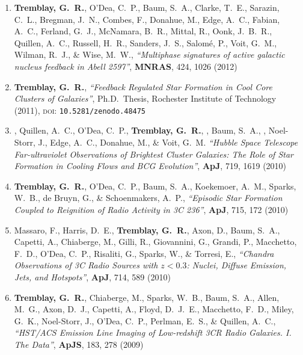 \documentclass[11pt]{article}
\begin{document}
\begin{enumerate}
\item \textbf{Tremblay, G.~R.}, O'Dea, C.~P., Baum, S.~A., Clarke, T.~E., Sarazin,
C.~L., Bregman, J.~N., Combes, F., Donahue, M., Edge, A.~C., Fabian, A.~C.,
Ferland, G.~J., McNamara, B.~R., Mittal, R., Oonk, J.~B.~R., Quillen,
A.~C., Russell, H.~R., Sanders, J.~S., Salom{\'e}, P., Voit, G.~M., Wilman,
R.~J., \& Wise, M.~W., \textit{ ``Multiphase signatures of active galactic nucleus feedback in Abell 2597''}, \textbf{MNRAS}, 424,  1026 (2012)



\item \textbf{Tremblay, G.~R.}, \textit{``Feedback Regulated Star Formation in Cool Core
Clusters of Galaxies''}, Ph.D.~Thesis, Rochester Institute of Technology (2011), \textsc{doi}: \texttt{10.5281/zenodo.48475}



\item {}, Quillen, A.~C., O'Dea, C.~P., \textbf{Tremblay, G.~R.}, , Baum, S.~A., , Noel-Storr, J., Edge, A.~C., Donahue,
M., \& Voit, G.~M.  \textit{``Hubble Space Telescope Far-ultraviolet Observations of Brightest Cluster Galaxies: The Role of Star Formation in Cooling Flows and BCG Evolution''}, \textbf{ApJ}, 719,  1619 (2010)



\item \textbf{Tremblay, G.~R.}, O'Dea, C.~P., Baum, S.~A., Koekemoer, A.~M., Sparks,
W.~B., de Bruyn, G.,
\& Schoenmakers, A.~P.,  \textit{``Episodic Star Formation Coupled to Reignition of Radio Activity in 3C 236''}, \textbf{ApJ}, 715,  172 (2010)




\item Massaro, F.,  Harris, D.~E., \textbf{Tremblay, G.~R.}, Axon, D.,
Baum, S.~A., Capetti, A., Chiaberge, M., Gilli, R.,
Giovannini, G., Grandi, P., Macchetto, F.~D., O'Dea, C.~P., Risaliti, G.,
Sparks, W.,
\& Torresi, E., \textit{``Chandra Observations of 3C Radio Sources with $z < 0.3$: Nuclei, Diffuse Emission, Jets, and Hotspots''}, \textbf{ApJ}, 714,  589 (2010)




\item \textbf{Tremblay, G.~R.}, Chiaberge, M., Sparks, W.~B., Baum, S.~A., Allen,
M.~G., Axon, D.~J., Capetti, A., Floyd, D.~J.~E., Macchetto, F.~D., Miley,
G.~K., Noel-Storr, J., O'Dea, C.~P., Perlman, E.~S.,
\& Quillen, A.~C.,  \textit{``HST/ACS Emission Line Imaging of Low-redshift 3CR Radio Galaxies. I. The Data''}, \textbf{ApJS}, 183,  278 (2009)




\end{enumerate}
\end{document}
